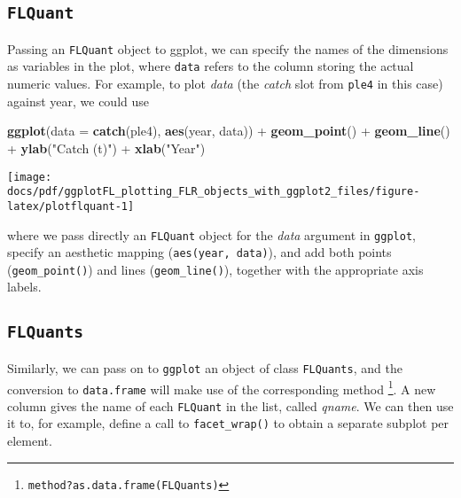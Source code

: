 \documentclass[]{article}
\newenvironment{Shaded}{\begin{snugshade}}{\end{snugshade}}
\newcommand{\KeywordTok}[1]{\textcolor[rgb]{0.13,0.29,0.53}{\textbf{{#1}}}}
\newcommand{\DataTypeTok}[1]{\textcolor[rgb]{0.13,0.29,0.53}{{#1}}}
\newcommand{\StringTok}[1]{\textcolor[rgb]{0.31,0.60,0.02}{{#1}}}
\newcommand{\NormalTok}[1]{{#1}}
\let\rmarkdownfootnote\footnote%
\def\footnote{\protect\rmarkdownfootnote}
\begin{document}
\subsection{\texorpdfstring{\texttt{FLQuant}}{FLQuant}}\label{flquant}

Passing an \texttt{FLQuant} object to ggplot, we can specify the names
of the dimensions as variables in the plot, where \texttt{data} refers
to the column storing the actual numeric values. For example, to plot
\emph{data} (the \emph{catch} slot from \texttt{ple4} in this case)
against year, we could use

\begin{Shaded}
\begin{Highlighting}[]
\KeywordTok{ggplot}\NormalTok{(}\DataTypeTok{data =} \KeywordTok{catch}\NormalTok{(ple4), }\KeywordTok{aes}\NormalTok{(year, data)) +}\StringTok{ }\KeywordTok{geom_point}\NormalTok{() +}\StringTok{ }\KeywordTok{geom_line}\NormalTok{() +}\StringTok{ }\KeywordTok{ylab}\NormalTok{(}\StringTok{"Catch (t)"}\NormalTok{) +}\StringTok{ }\KeywordTok{xlab}\NormalTok{(}\StringTok{"Year"}\NormalTok{)}
\end{Highlighting}
\end{Shaded}

\begin{center}\texttt{[image: docs/pdf/ggplotFL\_plotting\_FLR\_objects\_with\_ggplot2\_files/figure-latex/plotflquant-1]} \end{center}

where we pass directly an \texttt{FLQuant} object for the \emph{data}
argument in \texttt{ggplot}, specify an aesthetic mapping
(\texttt{aes(year,\ data)}), and add both points
(\texttt{geom\_point()}) and lines (\texttt{geom\_line()}), together
with the appropriate axis labels.

\subsection{\texorpdfstring{\texttt{FLQuants}}{FLQuants}}\label{flquants}

Similarly, we can pass on to \texttt{ggplot} an object of class
\texttt{FLQuants}, and the conversion to \texttt{data.frame} will make
use of the corresponding method \footnote{\texttt{method?as.data.frame(\textquotesingle{}FLQuants\textquotesingle{})}}.
A new column gives the name of each \texttt{FLQuant} in the list, called
\emph{qname}. We can then use it to, for example, define a call to
\texttt{facet\_wrap()} to obtain a separate subplot per element.
\end{document}
